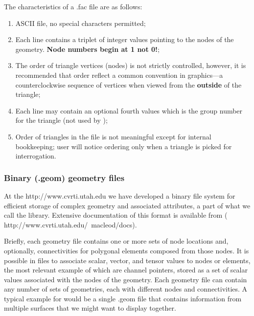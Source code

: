 The characteristics of a .fac file are as follows:
%
\begin{enumerate}
  \item ASCII file, no special characters permitted;
  \item Each line contains a triplet of integer values pointing to the
        nodes of the geometry.  \textbf{Node numbers begin at 1 not 0!};
  \item The order of triangle vertices (nodes) is not strictly controlled,
        however, it is recommended that order reflect a common convention
        in graphics---a counterclockwise sequence of vertices when viewed from
        the {\bf outside} of the triangle;
  \item Each line may contain an optional fourth values which is the group
        number for the triangle (not used by \map{});
  \item Order of triangles in the file is not meaningful except for
        internal bookkeeping; user will notice ordering only when a
        triangle is picked for interrogation.
\end{enumerate}

\subsubsection{Binary (.geom) geometry files}
\label{sec:geomfile}


At the  {http://www.cvrti.utah.edu} we have
developed a binary file system for efficient storage of complex geometry
and associated attributes, a part of what we call the \graphicsio{}
library.  Extensive documentation of this format is available from \rob{}
(
{http://www.cvrti.utah.edu/~macleod/docs}).

Briefly, each \graphicsio{} geometry file contains one or more sets of
node locations and, optionally, connectivities for polygonal elements
composed from those nodes.  It is possible in \graphicsio{} files to
associate scalar, vector, and tensor values to nodes or elements, the
most relevant example of which are channel pointers, stored as a set of
scalar values associated with the nodes of the geometry.  Each 
\graphicsio{} geometry file can contain any number of sets of 
geometries, each with different nodes and connectivities.  A typical
example for \map{} would be a single .geom file that contains information
from multiple surfaces that we might want to display together.


